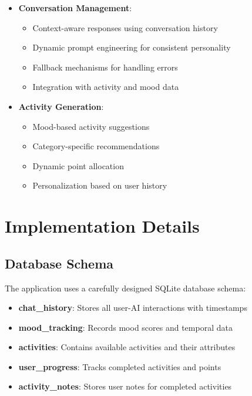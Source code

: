 \documentclass[12pt]{article}
\begin{document}
\begin{itemize}
    \item \textbf{Conversation Management}:
    \begin{itemize}
        \item Context-aware responses using conversation history
        \item Dynamic prompt engineering for consistent personality
        \item Fallback mechanisms for handling errors
        \item Integration with activity and mood data
    \end{itemize}
    
    \item \textbf{Activity Generation}:
    \begin{itemize}
        \item Mood-based activity suggestions
        \item Category-specific recommendations
        \item Dynamic point allocation
        \item Personalization based on user history
    \end{itemize}
\end{itemize}

\section{Implementation Details}

\subsection{Database Schema}
The application uses a carefully designed SQLite database schema:

\begin{itemize}
    \item \textbf{chat\_history}: Stores all user-AI interactions with timestamps
    \item \textbf{mood\_tracking}: Records mood scores and temporal data
    \item \textbf{activities}: Contains available activities and their attributes
    \item \textbf{user\_progress}: Tracks completed activities and points
    \item \textbf{activity\_notes}: Stores user notes for completed activities
\end{itemize}
\end{document}
